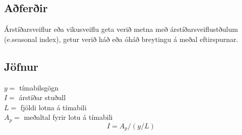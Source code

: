 \subsection{Aðferðir}
Árstíðarsveiflur eða vikusveiflu geta verið metna með árstíðarsveiflustðulum (e.seasonal index), getur verið háð eða óháð breytingu á meðal eftirspurnar.



	

\subsection{Jöfnur}

	$y =$ tímabilsgögn\\
	$I =$	árstíðar stuðull \\
	$L =$ fjöldi lotna á tímabili \\
	$A_p =$ meðaltal fyrir lotu á tímabili\\


	$$ I =  A_p/(y/L) $$\\


%